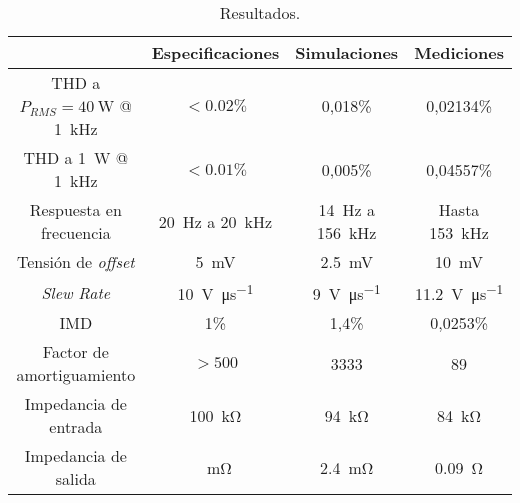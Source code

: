 \begin{table}[H]
	\centering
	\begin{tabular}{cccc}
		\toprule
		& Especificaciones & Simulaciones & Mediciones \\
		\midrule
		THD a $P_{\textit{RMS}} = \SI{40}{\watt}$ @ \SI{1}{\kilo\hertz}& $< \num{0.02}\%$ &  0,018\% & 0,02134\% \\
		THD a \SI{1}{\watt} @ \SI{1}{\kilo\hertz} & $< \num{0.01}\%$ & 0,005\% & 0,04557\%\\
		Respuesta en frecuencia & \SI{20}{\hertz} a \SI{20}{\kilo\hertz} & \SI{14}{\hertz} a \SI{156}{\kilo\hertz} & Hasta \SI{153}{\kHz}\\
		Tensión de \textit{offset} & \SI{5}{\milli\volt} & \SI{2.5}{\milli\volt} & \SI{10}{\milli\volt} \\
		\textit{Slew Rate} & \SI{10}{\volt\per\micro\second} &  \SI{9}{\volt\per\micro\second} & \SI{11.2}{\volt\per\micro\second}\\
		IMD & 1\% & 1,4\% & 0,0253\% \\
		Factor de amortiguamiento & $>500$ & 3333 & 89 \\
		Impedancia de entrada & \SI{100}{\kilo\ohm} & \SI{94}{\kilo\ohm} & \SI{84}{\kilo\ohm} \\
		Impedancia de salida & \SI{}{\milli\ohm} & \SI{2.4}{\milli\ohm} & \SI{0.09}{\ohm} \\
		\bottomrule
	\end{tabular}
	\caption{Resultados.}
	\label{tab.resultados}
\end{table}
